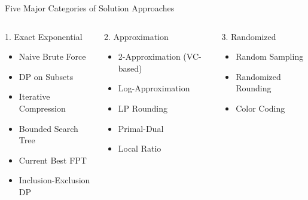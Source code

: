 \documentclass[aspectratio=169]{beamer}
\begin{document}

\begin{frame}{Five Major Categories of Solution Approaches}
    \small
    \begin{columns}[T]
        \begin{block}{1. Exact Exponential}
            \scriptsize
            \begin{itemize}
                \item Naive Brute Force
                \item DP on Subsets
                \item Iterative Compression
                \item Bounded Search Tree
                \item Current Best FPT
                \item Inclusion-Exclusion DP
            \end{itemize}
        \end{block}
        
        
        \begin{block}{2. Approximation}
            \scriptsize
            \begin{itemize}
                \item 2-Approximation (VC-based)
                \item Log-Approximation
                \item LP Rounding
                \item Primal-Dual
                \item Local Ratio
            \end{itemize}
        \end{block}
        
        \begin{block}{3. Randomized}
            \scriptsize
            \begin{itemize}
                \item Random Sampling
                \item Randomized Rounding
                \item Color Coding
            \end{itemize}
        \end{block}
        

\end{columns}
\end{frame}
\end{document}
